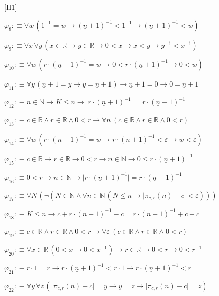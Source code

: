 \begin{fullproof}{[H1]}
\begin{abbrevlist}
\item $\varphi_{8} :\equiv \forall w\,(1^{-1} = w \to (\underline{n} + 1)^{-1} < 1^{-1} \to (\underline{n} + 1)^{-1} < w)$
\item $\varphi_{9} :\equiv \forall x\,\forall y\,(x \in \mathbb{R} \to y \in \mathbb{R} \to 0 < x \to x < y \to y^{-1} < x^{-1})$
\item $\varphi_{10} :\equiv \forall w\,(r \cdot (\underline{n} + 1)^{-1} = w \to 0 < r \cdot (\underline{n} + 1)^{-1} \to 0 < w)$
\item $\varphi_{11} :\equiv \forall y\,(\underline{n} + 1 = y \to y = \underline{n} + 1) \to \underline{n} + 1 = 0 \to 0 = \underline{n} + 1$
\item $\varphi_{12} :\equiv n \in \mathbb{N} \to K \leq n \to \lvert r \cdot (\underline{n} + 1)^{-1} \rvert = r \cdot (\underline{n} + 1)^{-1}$
\item $\varphi_{13} :\equiv c \in \mathbb{R} \land r \in \mathbb{R} \land 0 < r \to \forall n\,(c \in \mathbb{R} \land r \in \mathbb{R} \land 0 < r)$
\item $\varphi_{14} :\equiv \forall w\,(r \cdot (\underline{n} + 1)^{-1} = w \to r \cdot (\underline{n} + 1)^{-1} < \varepsilon \to w < \varepsilon)$
\item $\varphi_{15} :\equiv c \in \mathbb{R} \to r \in \mathbb{R} \to 0 < r \to n \in \mathbb{N} \to 0 \leq r \cdot (\underline{n} + 1)^{-1}$
\item $\varphi_{16} :\equiv 0 < r \to n \in \mathbb{N} \to \lvert r \cdot (\underline{n} + 1)^{-1} \rvert = r \cdot (\underline{n} + 1)^{-1}$
\item $\varphi_{17} :\equiv \forall N\,(\neg (N \in \mathbb{N} \land \forall n \in \mathbb{N}\,(N \leq n \to \lvert \pi_{c,r}(n) - c \rvert < \varepsilon)))$
\item $\varphi_{18} :\equiv K \leq n \to c + r \cdot (\underline{n} + 1)^{-1} - c = r \cdot (\underline{n} + 1)^{-1} + c - c$
\item $\varphi_{19} :\equiv c \in \mathbb{R} \land r \in \mathbb{R} \land 0 < r \to \forall \varepsilon\,(c \in \mathbb{R} \land r \in \mathbb{R} \land 0 < r)$
\item $\varphi_{20} :\equiv \forall x \in \mathbb{R}\,(0 < x \to 0 < x^{-1}) \to r \in \mathbb{R} \to 0 < r \to 0 < r^{-1}$
\item $\varphi_{21} :\equiv r \cdot 1 = r \to r \cdot (\underline{n} + 1)^{-1} < r \cdot 1 \to r \cdot (\underline{n} + 1)^{-1} < r$
\item $\varphi_{22} :\equiv \forall y\,\forall z\,(\lvert \pi_{c,r}(n) - c \rvert = y \to y = z \to \lvert \pi_{c,r}(n) - c \rvert = z)$

\end{abbrevlist}
\end{fullproof}
